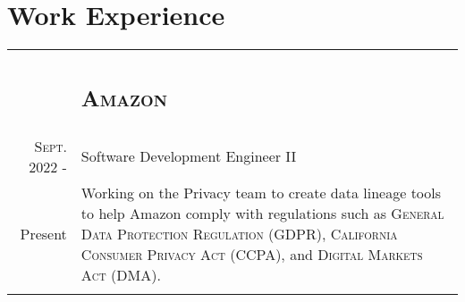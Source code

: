 \documentclass[letterpaper,10pt]{article}
\begin{document}
\section{Work Experience}
\begin{tabular}{R|B}

	                                & \subsection{\textsc{Amazon}}                                                                   \\

	\textsc{Sept.} 2022 -           & Software Development Engineer II                                                               \\
	Present\phantom{ -}             & \footnotesize Working on the Privacy team to create data lineage tools to help
	Amazon comply with regulations such as \textsc{General Data Protection Regulation (GDPR), California Consumer Privacy Act (CCPA)},
	and \textsc{Digital Markets Act (DMA)}.                                                                                          \\
	                                                                                                             \\


\end{tabular}
\end{document}
